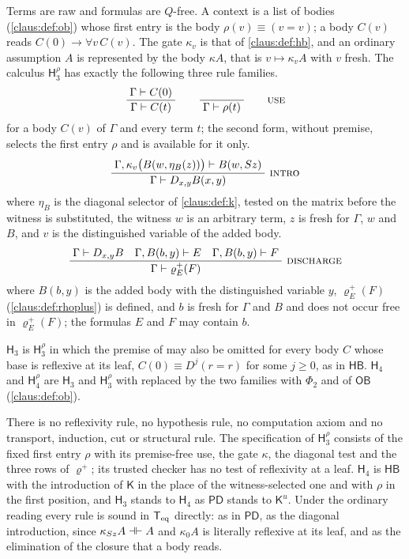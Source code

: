 \begin{definition}
\label{claus:def:h3}
Terms are raw and formulas are $Q$-free. A context is a list of bodies
(\cref{claus:def:ob}) whose first entry is the body
$\rho(v)\equiv(v=v)$; a body $C(v)$ reads $C(0)\to\forall v\,C(v)$. The
gate $\kappa_v$ is that of \cref{claus:def:hb}, and an ordinary
assumption $A$ is represented by the body $\kappa A$, that is
$v\mapsto\kappa_vA$ with $v$ fresh. The calculus $\mathsf{H}_3^{\rho}$ has
exactly the following three rule families.
\[
 \infrule{\Gamma\proves C(0)}{\Gamma\proves C(t)}
 \qquad
 \infrule{}{\Gamma\proves\rho(t)}
 \qquad\rulename{Use}
\]
for a body $C(v)$ of $\Gamma$ and every term $t$; the second form, without
premise, selects the first entry $\rho$ and is available for it only.
\[
 \infrule{\Gamma,\kappa_v\bigl(B(w,\eta_B(z))\bigr)\proves B(w,\Suc z)}
         {\Gamma\proves\D{x}{y}B(x,y)}\ \rulename{Intro}
\]
where $\eta_B$ is the diagonal selector of \cref{claus:def:k}, tested on
the matrix before the witness is substituted, the witness $w$ is an
arbitrary term, $z$ is fresh for $\Gamma$, $w$ and $B$, and $v$ is the
distinguished variable of the added body.
\[
 \infrule{\Gamma\proves\D{x}{y}B\quad
          \Gamma,B(b,y)\proves E\quad
          \Gamma,B(b,y)\proves F}
         {\Gamma\proves\varrho^{+}_E(F)}\ \rulename{Discharge}
\]
where $B(b,y)$ is the added body with the distinguished variable $y$,
$\varrho^{+}_E(F)$ (\cref{claus:def:rhoplus}) is defined, and $b$ is fresh
for $\Gamma$ and $B$ and does not occur free in $\varrho^{+}_E(F)$; the
formulas $E$ and $F$ may contain $b$.

$\mathsf{H}_3$ is $\mathsf{H}_3^{\rho}$ in which the premise of
 may also be omitted for every body $C$ whose base is
reflexive at its leaf, $C(0)\equiv D^j(r=r)$ for some $j\ge 0$, as in
$\mathsf{HB}$. $\mathsf{H}_4$ and $\mathsf{H}_4^{\rho}$ are $\mathsf{H}_3$
and $\mathsf{H}_3^{\rho}$ with  replaced by the two
families  with $\Phi_2$ and  of
$\mathsf{OB}$ (\cref{claus:def:ob}).
\end{definition}

There is no reflexivity rule, no hypothesis rule, no computation axiom and
no transport, induction, cut or structural rule. The specification of
$\mathsf{H}_3^{\rho}$ consists of the fixed first entry $\rho$ with its
premise-free use, the gate $\kappa$, the diagonal test and the three rows
of $\varrho^{+}$; its trusted checker has no test of reflexivity at a
leaf. $\mathsf{H}_4$ is $\mathsf{HB}$ with the introduction of
$\mathsf{K}$ in the place of the witness-selected one and with $\rho$ in
the first position, and $\mathsf{H}_3$ stands to $\mathsf{H}_4$ as
$\mathsf{PD}$ stands to $\mathsf{K}^{u}$. Under the ordinary reading every
rule is sound in $\mathsf{T}_{\mathrm{eq}}$ directly:  as in $\mathsf{PD}$,
 as the diagonal introduction, since
$\kappa_{S z}A\dashv\vdash A$ and $\kappa_0A$ is literally reflexive at
its leaf, and  as the elimination of the closure that a body
reads.

